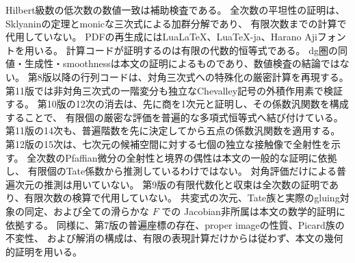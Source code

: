 \documentclass[a4paper,11pt]{ltjsarticle}
\theoremstyle{definition}
\begin{document}
Hilbert級数の低次数の数値一致は補助検査である。
全次数の平坦性の証明は、Sklyaninの定理とmonicな三次式による加群分解であり、
有限次数までの計算で代用していない。
PDFの再生成にはLuaLaTeX、LuaTeX-ja、Harano Ajiフォントを用いる。
計算コードが証明するのは有限の代数的恒等式である。
dg圏の同値・生成性・smoothnessは本文の証明によるものであり、数値検査の結論ではない。
第8版以降の行列コードは、対角三次式への特殊化の厳密計算を再現する。
第11版では非対角三次式の一階変分も独立なChevalley記号の外積作用素で検証する。
第10版の12次の消去は、先に商を1次元と証明し、その係数汎関数を構成することで、
有限個の厳密な評価を普遍的な多項式恒等式へ結び付けている。
第11版の14次も、普遍階数を先に決定してから五点の係数汎関数を適用する。
第12版の15次は、七次元の候補空間に対する七個の独立な接触像で全射性を示す。
全次数のPfaffian微分の全射性と境界の偶性は本文の一般的な証明に依拠し、
有限個のTate係数から推測しているわけではない。
対角評価だけによる普遍次元の推測は用いていない。
第9版の有限代数化と収束は全次数の証明であり、有限次数の検算で代用していない。
共変式の次元、Tate族と実際のgluing対象の同定、および全ての滑らかな $F$ での
Jacobian非所属は本文の数学的証明に依拠する。
同様に、第7版の普遍座標の存在、proper imageの性質、Picard族の不変性、
および解消の構成は、有限の表現計算だけからは従わず、本文の幾何的証明を用いる。
\end{document}
